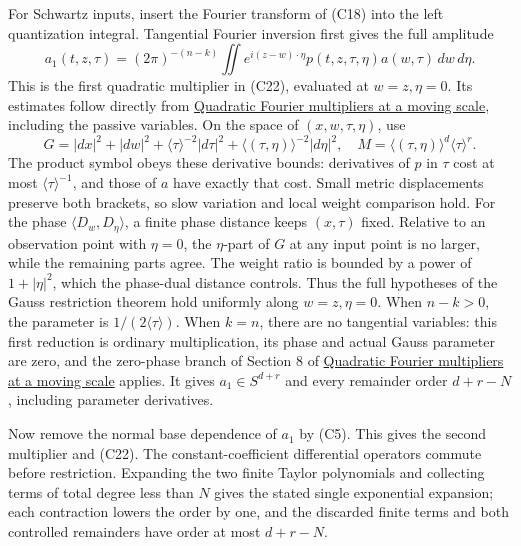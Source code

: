 \documentclass[
  11pt,
]{article}
\begin{document}
For Schwartz inputs, insert the Fourier transform of (C18) into the left
quantization integral. Tangential Fourier inversion first gives the full
amplitude \[
a_1(t,z,\tau)=(2\pi)^{-(n-k)}
\iint e^{i(z-w)\cdot\eta}p(t,z,\tau,\eta)a(w,\tau)\,dw\,d\eta.
\] This is the first quadratic multiplier in (C22), evaluated at
\(w=z,\eta=0\). Its estimates follow directly from
\href{gauss-transform-estimates.pdf}{Quadratic Fourier multipliers at a
moving scale}, including the passive variables. On the space of
\((x,w,\tau,\eta)\), use \[
G=|dx|^2+|dw|^2+\langle\tau\rangle^{-2}|d\tau|^2
+\langle(\tau,\eta)\rangle^{-2}|d\eta|^2,
\quad M=\langle(\tau,\eta)\rangle^d\langle\tau\rangle^r.
\tag{C24}
\] The product symbol obeys these derivative bounds: derivatives of
\(p\) in \(\tau\) cost at most \(\langle\tau\rangle^{-1}\), and those of
\(a\) have exactly that cost. Small metric displacements preserve both
brackets, so slow variation and local weight comparison hold. For the
phase \(\langle D_w,D_\eta\rangle\), a finite phase distance keeps
\((x,\tau)\) fixed. Relative to an observation point with \(\eta=0\),
the \(\eta\)-part of \(G\) at any input point is no larger, while the
remaining parts agree. The weight ratio is bounded by a power of
\(1+|\eta|^2\), which the phase-dual distance controls. Thus the full
hypotheses of the Gauss restriction theorem hold uniformly along
\(w=z,\eta=0\). When \(n-k>0\), the parameter is
\(1/(2\langle\tau\rangle)\). When \(k=n\), there are no tangential
variables: this first reduction is ordinary multiplication, its phase
and actual Gauss parameter are zero, and the zero-phase branch of
Section 8 of \href{gauss-transform-estimates.pdf}{Quadratic Fourier
multipliers at a moving scale} applies. It gives \(a_1\in S^{d+r}\) and
every remainder order \(d+r-N\), including parameter derivatives.

Now remove the normal base dependence of \(a_1\) by (C5). This gives the
second multiplier and (C22). The constant-coefficient differential
operators commute before restriction. Expanding the two finite Taylor
polynomials and collecting terms of total degree less than \(N\) gives
the stated single exponential expansion; each contraction lowers the
order by one, and the discarded finite terms and both controlled
remainders have order at most \(d+r-N\).
\end{document}
